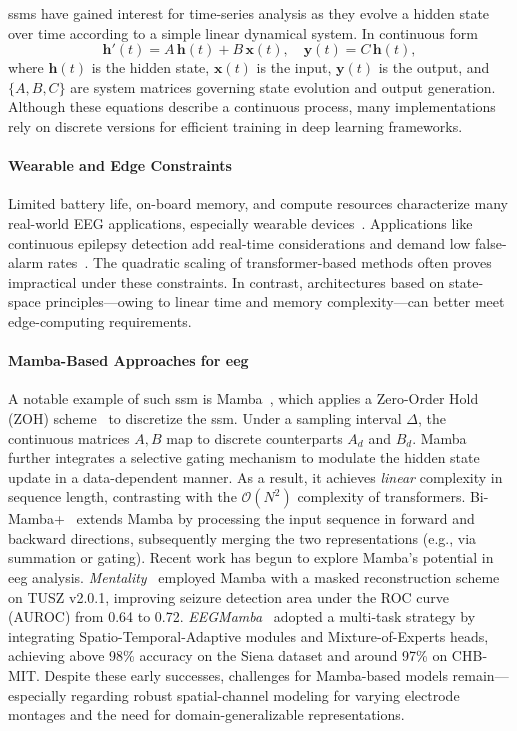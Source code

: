 \glspl{ssm} have gained interest for time-series analysis as they evolve a hidden state over time according to a simple linear dynamical system. In continuous form
\begin{equation*} 
\mathbf{h}'(t) = A\,\mathbf{h}(t) + B\,\mathbf{x}(t), \quad \mathbf{y}(t) = C\,\mathbf{h}(t), 
\end{equation*}
where $\mathbf{h}(t)$ is the hidden state, $\mathbf{x}(t)$ is the input, $\mathbf{y}(t)$ is the output, and $\{A, B, C\}$ are system matrices governing state evolution and output generation. Although these equations describe a continuous process, many implementations rely on discrete versions for efficient training in deep learning frameworks.


\paragraph*{Wearable and Edge Constraints}
Limited battery life, on-board memory, and compute resources characterize many real-world EEG applications, especially wearable devices~\cite{ingolfsson_brainfusenet_2024}. Applications like continuous epilepsy detection add real-time considerations and demand low false-alarm rates~\cite{ingolfsson_minimizing_2024}. The quadratic scaling of transformer-based methods often proves impractical under these constraints. In contrast, architectures based on state-space principles—owing to linear time and memory complexity—can better meet edge-computing requirements.


\paragraph*{Mamba-Based Approaches for \gls{eeg}}
A notable example of such \gls{ssm} is Mamba~\cite{gu2023mamba}, which applies a Zero-Order Hold (ZOH) scheme~\cite{pechlivanidou2022zero} to discretize the \gls{ssm}. Under a sampling interval $\Delta$, the continuous matrices $A,B$ map to discrete counterparts $A_d$ and $B_d$. Mamba further integrates a selective gating mechanism to modulate the hidden state update in a data-dependent manner. As a result, it achieves \emph{linear} complexity in sequence length, contrasting with the $\mathcal{O}(N^2)$ complexity of transformers. Bi-Mamba+~\cite{liang_bi-mamba_2024} extends Mamba by processing the input sequence in forward and backward directions, subsequently merging the two representations (e.g., via summation or gating). Recent work has begun to explore Mamba’s potential in \gls{eeg} analysis. \emph{Mentality}~\cite{Panchavati_mentality_2024} employed Mamba with a masked reconstruction scheme on TUSZ v2.0.1, improving seizure detection area under the ROC curve (AUROC) from 0.64 to 0.72. \emph{EEGMamba}~\cite{gui_eegmamba_2024} adopted a multi-task strategy by integrating Spatio-Temporal-Adaptive modules and Mixture-of-Experts heads, achieving above 98\% accuracy on the Siena dataset and around 97\% on CHB-MIT. Despite these early successes, challenges for Mamba-based models remain—especially regarding robust spatial-channel modeling for varying electrode montages and the need for domain-generalizable representations.


